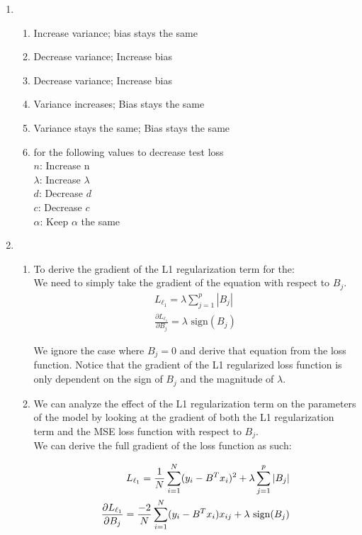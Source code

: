 \documentclass[12pt]{article}
\begin{document}
\begin{enumerate}
\item 
\begin{enumerate}
\item Increase variance; bias stays the same
\item Decrease variance; Increase bias
\item Decrease variance; Increase bias 
\item Variance increases; Bias stays the same 
\item Variance stays the same; Bias stays the same 
\item for the following values to decrease test loss\\
    $n$: Increase n \\ 
    $\lambda$: Increase $\lambda$ \\ 
    $d$: Decrease $d$ \\ 
    $c$: Decrease $c$ \\ 
    $\alpha$: Keep $\alpha$ the same 
\end{enumerate}

\item
\begin{enumerate}
\item To derive the gradient of the L1 regularization term for the: \\ 
We need to simply take the gradient of the equation with respect to $B_j$. 
\begin{align}
  L_{\ell_1} = \lambda \sum_{j=1}^{p} |B_j| \\ 
  \frac{\partial L_{\ell_1}}{\partial B_j} = \lambda \text{ sign} (B_j)
\end{align}

We ignore the case where $B_j = 0$ and derive that equation from the loss function. Notice that the gradient of the L1 regularized loss function
is only dependent on the sign of $B_j$ and the magnitude of $\lambda$.

\item  We can analyze the effect of the L1 regularization term on the parameters of the model by looking 
at the gradient of both the L1 regularization term and the MSE loss function with respect to $B_j$. \\ 

We can derive the full gradient of the loss function as such: 

\begin{align}
  L_{\ell_1} = \frac{1}{N} \sum_{i=1}^{N} (y_i - B^T x_i)^2 + \lambda \sum_{j=1}^{p} |B_j| \notag \\ 
  \frac{\partial L_{\ell_1}}{\partial B_j} = \frac{-2}{N} \sum_{i=1}^{N} (y_i - B^T x_i)x_{ij} + \lambda \text{ sign}(B_j)
\end{align}


\end{enumerate}
\end{enumerate}
\end{document}
